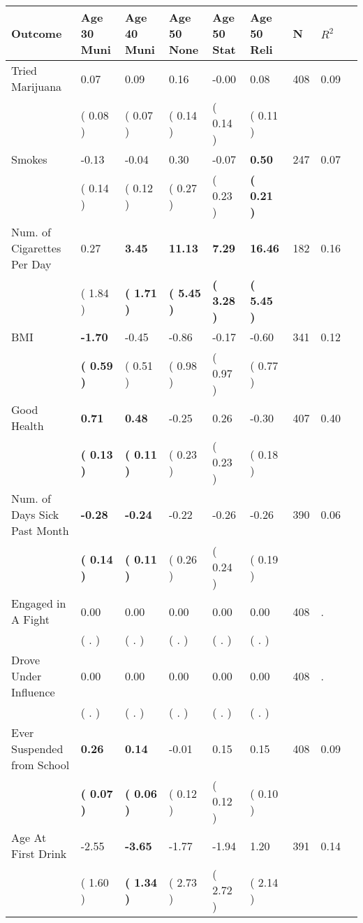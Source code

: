 \begin{tabular}{L{6.2cm} C{1.8cm} C{1.8cm} C{1.8cm} C{1.8cm} C{1.8cm} C{1.8cm} C{0.3cm} C{0.3cm}}
\toprule
 \textbf{Outcome} & \textbf{Age 30 Muni} & \textbf{Age 40 Muni} & \textbf{Age 50 None} & \textbf{Age 50 Stat} & \textbf{Age 50 Reli} & \textbf{N} & \textbf{$ R^2$} \\
\midrule
Tried Marijuana &      0.07 &      0.09 &      0.16 &     -0.00 &      0.08  & 408 &       0.09 \\ 
 & (     0.08 ) & (     0.07 ) & (     0.14 ) & (     0.14 ) & (     0.11 )  & \\
Smokes &     -0.13 &     -0.04 &      0.30 &     -0.07 & \textbf{     0.50}  & 247 &       0.07 \\ 
 & (     0.14 ) & (     0.12 ) & (     0.27 ) & (     0.23 ) & \textbf{(     0.21 )}  & \\
Num. of Cigarettes Per Day &      0.27 & \textbf{     3.45} & \textbf{    11.13} & \textbf{     7.29} & \textbf{    16.46}  & 182 &       0.16 \\ 
 & (     1.84 ) & \textbf{(     1.71 )} & \textbf{(     5.45 )} & \textbf{(     3.28 )} & \textbf{(     5.45 )}  & \\
BMI & \textbf{    -1.70} &     -0.45 &     -0.86 &     -0.17 &     -0.60  & 341 &       0.12 \\ 
 & \textbf{(     0.59 )} & (     0.51 ) & (     0.98 ) & (     0.97 ) & (     0.77 )  & \\
Good Health & \textbf{     0.71} & \textbf{     0.48} &     -0.25 &      0.26 &     -0.30  & 407 &       0.40 \\ 
 & \textbf{(     0.13 )} & \textbf{(     0.11 )} & (     0.23 ) & (     0.23 ) & (     0.18 )  & \\
Num. of Days Sick Past Month & \textbf{    -0.28} & \textbf{    -0.24} &     -0.22 &     -0.26 &     -0.26  & 390 &       0.06 \\ 
 & \textbf{(     0.14 )} & \textbf{(     0.11 )} & (     0.26 ) & (     0.24 ) & (     0.19 )  & \\
Engaged in A Fight &      0.00 &      0.00 &      0.00 &      0.00 &      0.00  & 408 &          . \\ 
 & (        . ) & (        . ) & (        . ) & (        . ) & (        . )  & \\
Drove Under Influence &      0.00 &      0.00 &      0.00 &      0.00 &      0.00  & 408 &          . \\ 
 & (        . ) & (        . ) & (        . ) & (        . ) & (        . )  & \\
Ever Suspended from School & \textbf{     0.26} & \textbf{     0.14} &     -0.01 &      0.15 &      0.15  & 408 &       0.09 \\ 
 & \textbf{(     0.07 )} & \textbf{(     0.06 )} & (     0.12 ) & (     0.12 ) & (     0.10 )  & \\
Age At First Drink &     -2.55 & \textbf{    -3.65} &     -1.77 &     -1.94 &      1.20  & 391 &       0.14 \\ 
 & (     1.60 ) & \textbf{(     1.34 )} & (     2.73 ) & (     2.72 ) & (     2.14 )  & \\
\bottomrule
\end{tabular}
